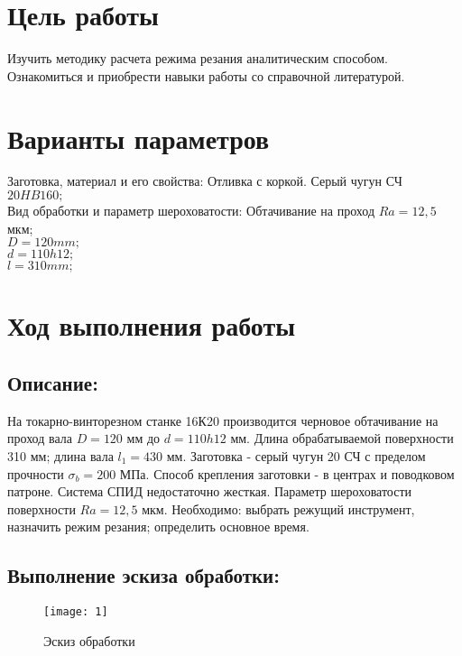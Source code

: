 








\section{Цель работы}
Изучить методику расчета режима резания аналитическим способом. Ознакомиться и приобрести навыки работы со справочной литературой.

\section{Варианты параметров}			
Заготовка, материал и его свойства: Отливка с коркой. Серый чугун СЧ $20 HB160;$\\

Вид обработки и параметр шероховатости: Обтачивание на проход $Ra = 12,5$ мкм;\\

$D = 120 mm;$\\

$d = 110h12;$\\

$l = 310 mm;$\\									
\section{Ход выполнения работы}

\subsection{Описание:}
На токарно-винторезном станке 16К20 производится черновое обтачивание на проход вала $D = 120$ мм до $d = 110h12$ мм. Длина обрабатываемой поверхности 310 мм; длина вала $l_1= 430$ мм. Заготовка - серый чугун 20 СЧ с пределом прочности $\sigma_b = 200$ МПа. Способ крепления заготовки - в центрах и поводковом патроне. Система СПИД недостаточно жесткая. Параметр шероховатости поверхности $Ra = 12,5$ мкм. Необходимо: выбрать режущий инструмент, назначить режим резания; определить основное время.

\subsection{Выполнение эскиза обработки:}
\begin{figure}[H]
	\begin{center}
		\texttt{[image: 1]}
		\caption{Эскиз обработки} 
		\label{pic:pic_1} %
	\end{center}
\end{figure}

